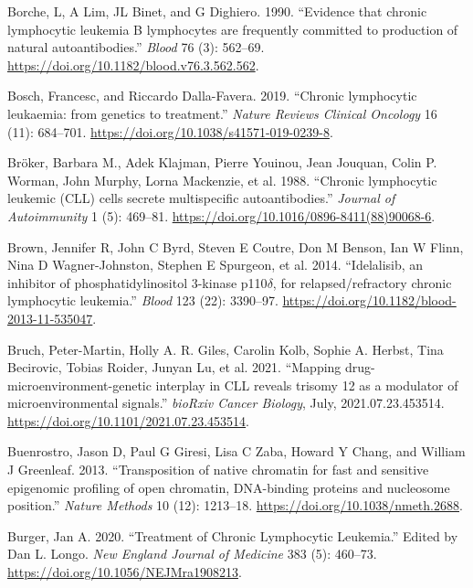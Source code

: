 \documentclass[11pt, a4paper, twosided]{book}
\newenvironment{CSLReferences}%
  {}%
  {\par}
\begin{document}
\begin{CSLReferences}{1}{0}
\leavevmode{}%
Borche, L, A Lim, JL Binet, and G Dighiero. 1990. {``{Evidence that chronic lymphocytic leukemia B lymphocytes are frequently committed to production of natural autoantibodies}.''} \emph{Blood} 76 (3): 562--69. \url{https://doi.org/10.1182/blood.v76.3.562.562}.

\leavevmode{}%
Bosch, Francesc, and Riccardo Dalla-Favera. 2019. {``{Chronic lymphocytic leukaemia: from genetics to treatment}.''} \emph{Nature Reviews Clinical Oncology} 16 (11): 684--701. \url{https://doi.org/10.1038/s41571-019-0239-8}.

\leavevmode{}%
Bröker, Barbara M., Adek Klajman, Pierre Youinou, Jean Jouquan, Colin P. Worman, John Murphy, Lorna Mackenzie, et al. 1988. {``{Chronic lymphocytic leukemic (CLL) cells secrete multispecific autoantibodies}.''} \emph{Journal of Autoimmunity} 1 (5): 469--81. \url{https://doi.org/10.1016/0896-8411(88)90068-6}.

\leavevmode{}%
Brown, Jennifer R, John C Byrd, Steven E Coutre, Don M Benson, Ian W Flinn, Nina D Wagner-Johnston, Stephen E Spurgeon, et al. 2014. {``{Idelalisib, an inhibitor of phosphatidylinositol 3-kinase p110\(\delta\), for relapsed/refractory chronic lymphocytic leukemia}.''} \emph{Blood} 123 (22): 3390--97. \url{https://doi.org/10.1182/blood-2013-11-535047}.

\leavevmode{}%
Bruch, Peter-Martin, Holly A. R. Giles, Carolin Kolb, Sophie A. Herbst, Tina Becirovic, Tobias Roider, Junyan Lu, et al. 2021. {``{Mapping drug-microenvironment-genetic interplay in CLL reveals trisomy 12 as a modulator of microenvironmental signals}.''} \emph{bioRxiv Cancer Biology}, July, 2021.07.23.453514. \url{https://doi.org/10.1101/2021.07.23.453514}.

\leavevmode{}%
Buenrostro, Jason D, Paul G Giresi, Lisa C Zaba, Howard Y Chang, and William J Greenleaf. 2013. {``{Transposition of native chromatin for fast and sensitive epigenomic profiling of open chromatin, DNA-binding proteins and nucleosome position}.''} \emph{Nature Methods} 10 (12): 1213--18. \url{https://doi.org/10.1038/nmeth.2688}.

\leavevmode{}%
Burger, Jan A. 2020. {``{Treatment of Chronic Lymphocytic Leukemia}.''} Edited by Dan L. Longo. \emph{New England Journal of Medicine} 383 (5): 460--73. \url{https://doi.org/10.1056/NEJMra1908213}.


\end{CSLReferences}
\end{document}
